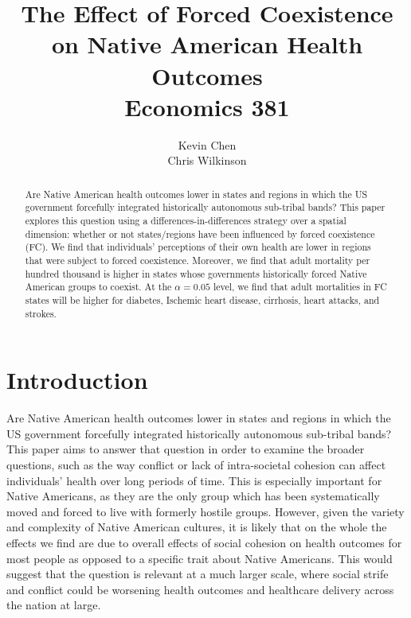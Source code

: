 \documentclass[12pt]{article}
\title{
The Effect of Forced Coexistence \\ on Native American Health Outcomes \\ 
{\small \sc Economics 381}
}
\author{Kevin Chen \\ Chris Wilkinson}
\begin{document}

\maketitle

\begin{abstract}
Are Native American health outcomes lower in states and regions in which the US government forcefully integrated historically autonomous sub-tribal bands? This paper explores this question using a differences-in-differences strategy over a spatial dimension: whether or not states/regions have been influenced by forced coexistence (FC). We find that individuals' perceptions of their own health are lower in regions that were subject to forced coexistence. Moreover, we find that adult mortality per hundred thousand is higher in states whose governments historically forced Native American groups to coexist. At the $\alpha = 0.05$ level, we find that adult mortalities in FC states will be higher for diabetes, Ischemic heart disease, cirrhosis, heart attacks, and strokes.
\end{abstract}

\newpage


\doublespacing

\section{Introduction}
Are Native American health outcomes lower in states and regions in which the US government forcefully integrated historically autonomous sub-tribal bands? 
This paper aims to answer that question in order to examine the broader questions, such as the way conflict or lack of intra-societal cohesion can affect individuals’ health over long periods of time.
This is especially important for Native Americans, as they are the only group which has been systematically moved and forced to live with formerly hostile groups.
However, given the variety and complexity of Native American cultures, it is likely that on the whole the effects we find are due to overall effects of social cohesion on health outcomes for most people as opposed to a specific trait about Native Americans.
This would suggest that the question is relevant at a much larger scale, where social strife and conflict could be worsening health outcomes and healthcare delivery across the nation at large.
\end{document}
